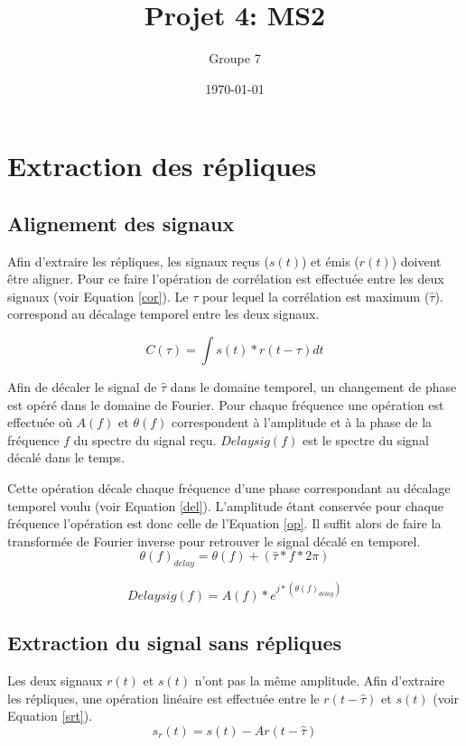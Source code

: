 \documentclass[10pt,a4paper]{article}
\begin{document}
\title{Projet 4: MS2}
\date\today
\author{Groupe 7}
\maketitle

\section{Extraction des répliques}
	\subsection*{Alignement des signaux}
	Afin d'extraire les répliques, les signaux reçus ($s(t)$) et émis ($r(t)$) doivent être aligner. Pour ce faire l'opération de corrélation est effectuée entre les deux signaux (voir Equation \ref{cor}). Le $\tau$ pour lequel la corrélation est maximum ($\hat{\tau}$). correspond au décalage temporel entre les deux signaux. 
	 
	\begin{equation}
	\label{cor}
	C(\tau) = \int s(t) * r(t-\tau) dt
	\end{equation}
	
	Afin de décaler le signal de $\hat{\tau}$ dans le domaine temporel, un changement de phase est opéré dans le domaine de Fourier. Pour chaque fréquence une opération est effectuée où $A(f)$ et $\theta(f)$ correspondent  à l'amplitude et à la phase de la fréquence $f$ du spectre du signal reçu. $Delaysig(f)$ est le spectre du signal décalé dans le temps. 
	
	Cette opération décale chaque fréquence d'une phase correspondant au décalage temporel voulu (voir Equation \ref{del}).  L'amplitude étant conservée pour chaque fréquence l'opération est donc celle de l'Equation \ref{op}. Il suffit alors de faire la transformée de Fourier inverse pour retrouver le signal décalé en temporel. 
	\begin{equation}
		\label{del}
			\theta(f)_{delay} = \theta(f) + (\hat {\tau} * f* 2\pi)
	\end{equation}
	
	\begin{equation}
		\label{op}
			Delaysig(f) = A(f)* e^{j*(\theta(f)_{delay})}
	\end{equation}
	
	\subsection*{Extraction du signal sans répliques}
			Les deux signaux $r(t)$ et $s(t)$ n'ont pas la même amplitude. Afin d'extraire les répliques, une opération linéaire est effectuée entre le $r(t-\hat{\tau})$ et $s(t)$ (voir Equation \ref{srt}).
			\begin{equation}
				\label{srt}
				s_r(t) = s(t) - Ar(t-\hat{\tau})
			\end{equation} 
			
\end{document}
